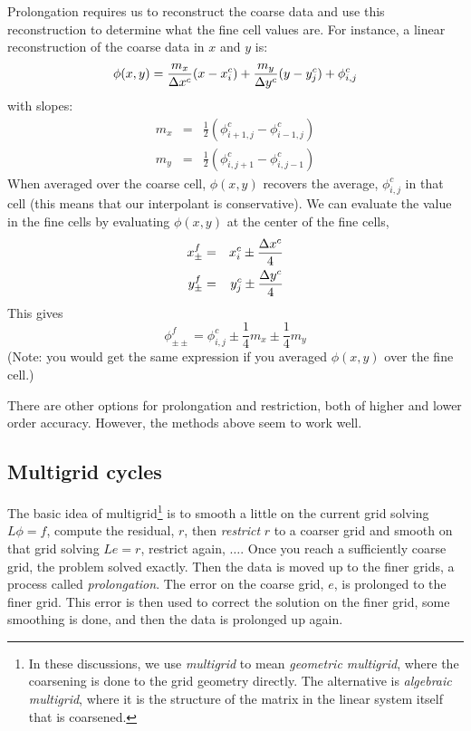 Prolongation requires us to reconstruct the coarse data and use
this reconstruction to determine what the fine cell values are.  For
instance, a linear reconstruction of the coarse data in $x$ and $y$ is:
\begin{equation}
\phi(x,y) = \frac{m_x}{\Delta x^c} (x - x_i^c) + 
            \frac{m_y}{\Delta y^c} (y - y_j^c) + \phi_{i,j}^c
\end{equation}
with slopes:
\begin{eqnarray}
m_x &=& \frac{1}{2}({\phi_{i+1,j}^c - \phi_{i-1,j}^c}) \\
m_y &=& \frac{1}{2}({\phi_{i,j+1}^c - \phi_{i,j-1}^c})
\end{eqnarray}
%
When averaged over the coarse cell, $\phi(x,y)$ recovers the average,
$\phi_{i,j}^c$ in that cell (this means that our interpolant is
conservative).  We can evaluate the value in the fine cells by
evaluating $\phi(x,y)$ at the center of the fine cells,
\begin{eqnarray}
x_\pm^f &=& x_i^c \pm \frac{\Delta x^c}{4} \\
y_\pm^f &=& y_j^c \pm \frac{\Delta y^c}{4} \\
\end{eqnarray}
This gives
\begin{equation}
\phi_{\pm\pm}^f = \phi_{i,j}^c \pm \frac{1}{4}m_x \pm \frac{1}{4}m_y
\end{equation}
(Note: you would get the same expression if you averaged $\phi(x,y)$ over
the fine cell.)

There are other options for prolongation and restriction, both of
higher and lower order accuracy.  However, the methods above seem to
work well.


\subsection{Multigrid cycles}

The basic idea of
multigrid\footnote{ In these discussions, we use {\em multigrid} to
  mean {\em geometric multigrid}, where the coarsening is done to the
  grid geometry directly.  The alternative is {\em algebraic
    multigrid}, where it is the structure of the matrix in the linear
  system itself that is coarsened.}  is to smooth a little on the
current grid solving $L\phi = f$, compute the residual, $r$, then {\em
  restrict} $r$ to a coarser grid and smooth on that grid solving $Le
= r$, restrict again, $\ldots$.  Once you reach a sufficiently coarse
grid, the problem solved exactly.  Then the data is moved up to the
finer grids, a process called {\em prolongation}.  The error on the
coarse grid, $e$, is prolonged to the finer grid.  This error is then
used to correct the solution on the finer grid, some smoothing is
done, and then the data is prolonged up again.

